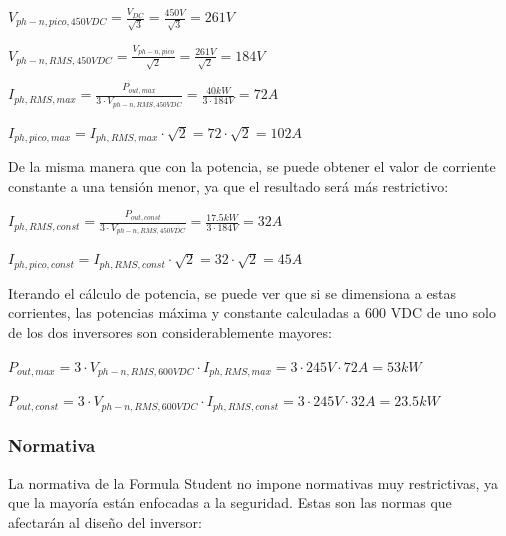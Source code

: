\(V_{ph-n, pico, 450 VDC} = \frac{V_{DC}}{\sqrt{3}} = \frac{450 V}{\sqrt{3}} = 261 V\)

\(V_{ph-n, RMS, 450 VDC} = \frac{V_{ph-n, pico}}{\sqrt{2}} = \frac{261 V}{\sqrt{2}} = 184 V\)


\(I_{ph, RMS, max} = \frac{P_{out, max}}{3\cdot V_{ph-n, RMS, 450 VDC}} = \frac{40 kW}{3\cdot184 V} = 72 A\)

\(I_{ph, pico, max} = I_{ph, RMS, max}\cdot\sqrt{2} = 72 \cdot\sqrt{2} = 102 A\)

De la misma manera que con la potencia, se puede obtener el valor de corriente constante a una tensión menor, ya que el resultado será más restrictivo:

\(I_{ph, RMS, const} = \frac{P_{out, const}}{3\cdot V_{ph-n, RMS, 450 VDC}} = \frac{17.5 kW}{3\cdot184 V} = 32 A\)

\(I_{ph, pico, const} = I_{ph, RMS, const}\cdot\sqrt{2} = 32 \cdot\sqrt{2} = 45 A\)


Iterando el cálculo de potencia, se puede ver que si se dimensiona a estas corrientes, las potencias máxima y constante calculadas a 600 VDC de uno solo de los dos inversores son considerablemente mayores:

\(P_{out, max} = 3\cdot V_{ph-n, RMS, 600 VDC}\cdot I_{ph, RMS, max} = 3\cdot245 V\cdot 72 A = 53 kW\)

\(P_{out, const} = 3\cdot V_{ph-n, RMS, 600 VDC}\cdot I_{ph, RMS, const} = 3\cdot245 V\cdot 32 A = 23.5 kW\)


\subsubsection{Normativa}
La normativa de la Formula Student no impone normativas muy restrictivas, ya que la mayoría están enfocadas a la seguridad. Estas son las normas que afectarán al diseño del inversor:

